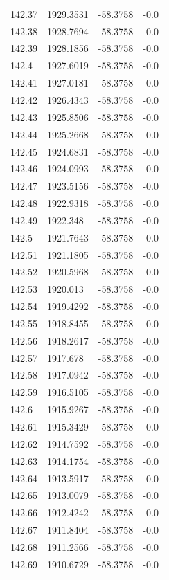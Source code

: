 \begin{table}[H]
\begin{tabular}{llll}
142.37 & 1929.3531 & -58.3758 & -0.0 \\
142.38 & 1928.7694 & -58.3758 & -0.0 \\
142.39 & 1928.1856 & -58.3758 & -0.0 \\
142.4 & 1927.6019 & -58.3758 & -0.0 \\
142.41 & 1927.0181 & -58.3758 & -0.0 \\
142.42 & 1926.4343 & -58.3758 & -0.0 \\
142.43 & 1925.8506 & -58.3758 & -0.0 \\
142.44 & 1925.2668 & -58.3758 & -0.0 \\
142.45 & 1924.6831 & -58.3758 & -0.0 \\
142.46 & 1924.0993 & -58.3758 & -0.0 \\
142.47 & 1923.5156 & -58.3758 & -0.0 \\
142.48 & 1922.9318 & -58.3758 & -0.0 \\
142.49 & 1922.348 & -58.3758 & -0.0 \\
142.5 & 1921.7643 & -58.3758 & -0.0 \\
142.51 & 1921.1805 & -58.3758 & -0.0 \\
142.52 & 1920.5968 & -58.3758 & -0.0 \\
142.53 & 1920.013 & -58.3758 & -0.0 \\
142.54 & 1919.4292 & -58.3758 & -0.0 \\
142.55 & 1918.8455 & -58.3758 & -0.0 \\
142.56 & 1918.2617 & -58.3758 & -0.0 \\
142.57 & 1917.678 & -58.3758 & -0.0 \\
142.58 & 1917.0942 & -58.3758 & -0.0 \\
142.59 & 1916.5105 & -58.3758 & -0.0 \\
142.6 & 1915.9267 & -58.3758 & -0.0 \\
142.61 & 1915.3429 & -58.3758 & -0.0 \\
142.62 & 1914.7592 & -58.3758 & -0.0 \\
142.63 & 1914.1754 & -58.3758 & -0.0 \\
142.64 & 1913.5917 & -58.3758 & -0.0 \\
142.65 & 1913.0079 & -58.3758 & -0.0 \\
142.66 & 1912.4242 & -58.3758 & -0.0 \\
142.67 & 1911.8404 & -58.3758 & -0.0 \\
142.68 & 1911.2566 & -58.3758 & -0.0 \\
142.69 & 1910.6729 & -58.3758 & -0.0 \\

\end{tabular}
\end{table}
